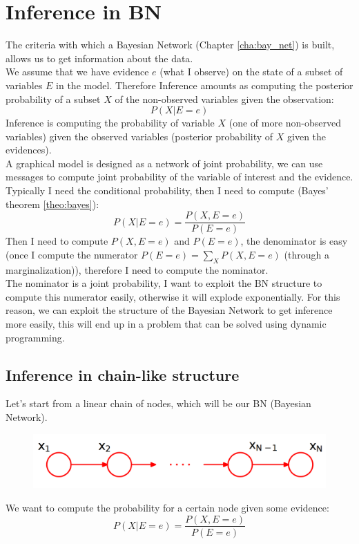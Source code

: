 \chapter{Inference in BN}
\label{cha:inter_BN}

The criteria with which a Bayesian Network (Chapter \ref{cha:bay_net}) is built, allows us to get information about the data.\\

We assume that we have evidence $e$ (what I observe) on the state of a subset of variables $E$ in the model. Therefore Inference amounts as computing the posterior probability of a subset $X$ of the non-observed variables given the observation:
$$P(X|E = e)$$
Inference is computing the probability of variable $X$ (one of more non-observed variables) given the observed variables (posterior probability of $X$ given the evidences).\\

A graphical model is designed as a network of joint probability, we can use messages to compute joint probability of the variable of interest and the evidence. Typically I need the conditional probability, then I need to compute (Bayes' theorem \ref{theo:bayes}):
$$P(X | E = e) = \frac{P(X, E=e)}{P(E=e)}$$
Then I need to compute $P(X, E=e)$ and $P(E=e)$, the denominator is easy (once I compute the numerator $P(E=e) = \sum_{X} P(X, E=e)$ (through a marginalization)), therefore I need to compute the nominator.\\
The nominator is a joint probability, I want to exploit the BN structure to compute this numerator easily, otherwise it will explode exponentially.
For this reason, we can exploit the structure of the Bayesian Network to get inference more easily, this will end up in a problem that can be solved using dynamic programming.

\section{Inference in chain-like structure}
    Let's start from a linear chain of nodes, which will be our BN (Bayesian Network).
    \begin{figure}[H]
        \centering
        \includegraphics[scale=0.3]{images/chain_inference_bn.png}
    \end{figure}
    We want to compute the probability for a certain node given some evidence:
    $$P(X| E=e) = \frac{P(X, E=e)}{P(E=e)}$$
    
